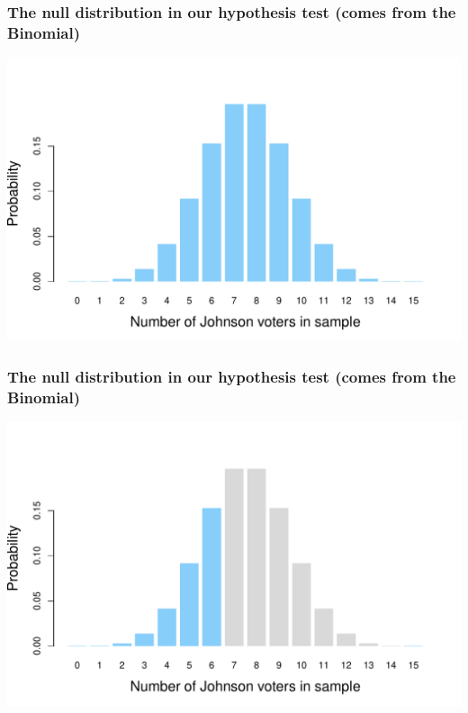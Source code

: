 \documentclass[aspectratio=169]{beamer}
\theoremstyle{principle}
\begin{document}
\begin{frame}
\frametitle{The null distribution in our hypothesis test (comes from the Binomial)}

\begin{center}
\includegraphics[scale=0.6]{binomial.pdf}
\end{center}

\end{frame}

\begin{frame}
\frametitle{The null distribution in our hypothesis test (comes from the Binomial)}

\begin{center}
\includegraphics[scale=0.6]{binomial_2.pdf}
\end{center}

\end{frame}
\end{document}
